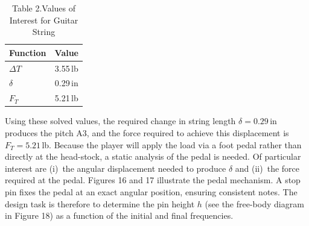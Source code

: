 \documentclass[12pt]{article}
\theoremstyle{definition} %
\theoremstyle{plain} %
\begin{document}
  \begin{table}[ht]
  \centering
  \caption*{Table 2.\;Values of Interest for Guitar String}
  \begin{tabular}{|l|c|}
  \hline
  \textbf{Function} & \textbf{Value} \\ \hline
  $\Delta T$ & 3.55\,lb \\ \hline
  $\delta$   & 0.29\,in \\ \hline
  $F_T$      & 5.21\,lb \\ \hline
  \end{tabular}
  \end{table}
  
  Using these solved values, the required change in string length
  $\delta = 0.29$\,in produces the pitch A3, and the force required to
  achieve this displacement is $F_T = 5.21$\,lb.  Because the player will
  apply the load via a foot pedal rather than directly at the head-stock,
  a static analysis of the pedal is needed.  Of particular interest are
  (i)~the angular displacement needed to produce $\delta$ and (ii)~the
  force required at the pedal.  Figures 16 and 17 illustrate the pedal
  mechanism.  A stop pin fixes the pedal at an exact angular position,
  ensuring consistent notes.  The design task is therefore to determine
  the pin height $h$ (see the free-body diagram in Figure 18) as a
  function of the initial and final frequencies.
\end{document}
